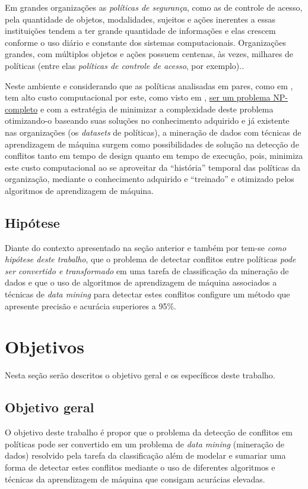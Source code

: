 \documentclass[
	12pt,				%
	openright,			%
	twoside,			%
	a4paper,			%
	english,			%
	french,				%
	spanish,			%
	brazil				%
	]{abntex2}
\begin{document}
Em grandes organizações as \textit{políticas de segurança}, como as de controle de acesso, pela quantidade de objetos, modalidades, sujeitos e ações inerentes a essas instituições tendem a ter grande quantidade de informações e elas crescem conforme o uso diário e constante dos sistemas computacionais. Organizações grandes, com múltiplos objetos e ações possuem centenas, às vezes, milhares de políticas (entre elas \textit{políticas de controle de acesso}, por exemplo).\cite{fugini_information_2004}.

Neste ambiente e considerando que as políticas analisadas em pares, como em , tem alto custo computacional por este, como visto em , \underline{ser um problema NP-completo} e com a estratégia de minimizar a complexidade deste problema otimizando-o baseando suas soluções no conhecimento adquirido e já existente nas organizações (os \textit{datasets} de políticas), a mineração de dados com técnicas de aprendizagem de máquina surgem como possibilidades de solução na detecção de conflitos tanto em tempo de design quanto em tempo de execução, pois, minimiza este custo computacional ao se aproveitar da ``história'' temporal das políticas da organização, mediante o conhecimento adquirido e ``treinado'' e otimizado pelos algoritmos de aprendizagem de máquina.

\subsection{Hipótese}\label{hipótese}
Diante do contexto apresentado na seção anterior e também por  tem-se \textit{como hipótese deste trabalho}, que o problema de detectar conflitos entre políticas\textit{ pode ser convertido e transformado} em uma tarefa de classificação da mineração de dados e que o uso de algoritmos de aprendizagem de máquina associados a técnicas de \textit{data mining} para detectar estes conflitos configure um método que apresente precisão e acurácia superiores a 95\%.

\section{Objetivos}\label{objetivos}
Nesta seção serão descritos o objetivo geral e os específicos deste trabalho.
\subsection{Objetivo geral}\label{objetivo_geral}
O objetivo deste trabalho é propor que o problema da detecção de conflitos em políticas pode ser convertido em um problema de \textit{data mining} (mineração de dados) resolvido pela tarefa da classificação além de modelar e sumariar uma forma de detectar estes conflitos mediante o uso de diferentes algoritmos e técnicas da aprendizagem de máquina que consigam acurácias elevadas.
\end{document}
